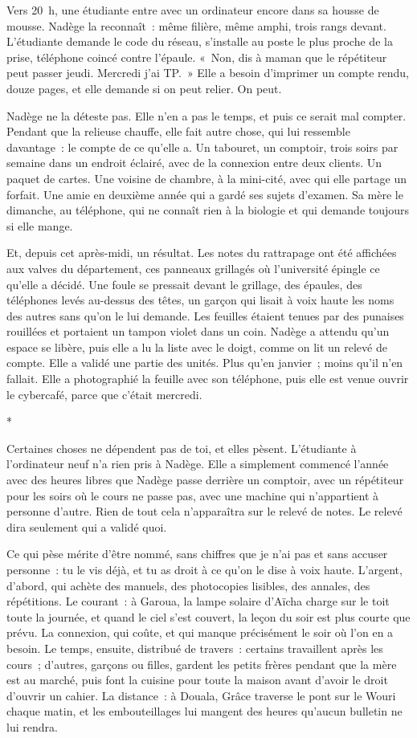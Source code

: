\documentclass[10.5pt,twoside,openright]{book}
\newcommand{\asterisme}{\par\vspace{0.7em}\centerline{\color{gris}*\quad*\quad*}\vspace{0.7em}\par\noindent}
\begin{document}
Vers 20 h, une étudiante entre avec un ordinateur encore dans sa housse de mousse. Nadège la reconnaît : même filière, même amphi, trois rangs devant. L’étudiante demande le code du réseau, s’installe au poste le plus proche de la prise, téléphone coincé contre l’épaule. « Non, dis à maman que le répétiteur peut passer jeudi. Mercredi j’ai TP. » Elle a besoin d’imprimer un compte rendu, douze pages, et elle demande si on peut relier. On peut.

Nadège ne la déteste pas. Elle n’en a pas le temps, et puis ce serait mal compter. Pendant que la relieuse chauffe, elle fait autre chose, qui lui ressemble davantage : le compte de ce qu’elle a. Un tabouret, un comptoir, trois soirs par semaine dans un endroit éclairé, avec de la connexion entre deux clients. Un paquet de cartes. Une voisine de chambre, à la mini-cité, avec qui elle partage un forfait. Une amie en deuxième année qui a gardé ses sujets d’examen. Sa mère le dimanche, au téléphone, qui ne connaît rien à la biologie et qui demande toujours si elle mange.

Et, depuis cet après-midi, un résultat. Les notes du rattrapage ont été affichées aux valves du département, ces panneaux grillagés où l’université épingle ce qu’elle a décidé. Une foule se pressait devant le grillage, des épaules, des téléphones levés au-dessus des têtes, un garçon qui lisait à voix haute les noms des autres sans qu’on le lui demande. Les feuilles étaient tenues par des punaises rouillées et portaient un tampon violet dans un coin. Nadège a attendu qu’un espace se libère, puis elle a lu la liste avec le doigt, comme on lit un relevé de compte. Elle a validé une partie des unités. Plus qu’en janvier ; moins qu’il n’en fallait. Elle a photographié la feuille avec son téléphone, puis elle est venue ouvrir le cybercafé, parce que c’était mercredi.

\asterisme

Certaines choses ne dépendent pas de toi, et elles pèsent. L’étudiante à l’ordinateur neuf n’a rien pris à Nadège. Elle a simplement commencé l’année avec des heures libres que Nadège passe derrière un comptoir, avec un répétiteur pour les soirs où le cours ne passe pas, avec une machine qui n’appartient à personne d’autre. Rien de tout cela n’apparaîtra sur le relevé de notes. Le relevé dira seulement qui a validé quoi.

Ce qui pèse mérite d’être nommé, sans chiffres que je n’ai pas et sans accuser personne : tu le vis déjà, et tu as droit à ce qu’on le dise à voix haute. L’argent, d’abord, qui achète des manuels, des photocopies lisibles, des annales, des répétitions. Le courant : à Garoua, la lampe solaire d’Aïcha charge sur le toit toute la journée, et quand le ciel s’est couvert, la leçon du soir est plus courte que prévu. La connexion, qui coûte, et qui manque précisément le soir où l’on en a besoin. Le temps, ensuite, distribué de travers : certains travaillent après les cours ; d’autres, garçons ou filles, gardent les petits frères pendant que la mère est au marché, puis font la cuisine pour toute la maison avant d’avoir le droit d’ouvrir un cahier. La distance : à Douala, Grâce traverse le pont sur le Wouri chaque matin, et les embouteillages lui mangent des heures qu’aucun bulletin ne lui rendra.
\end{document}
